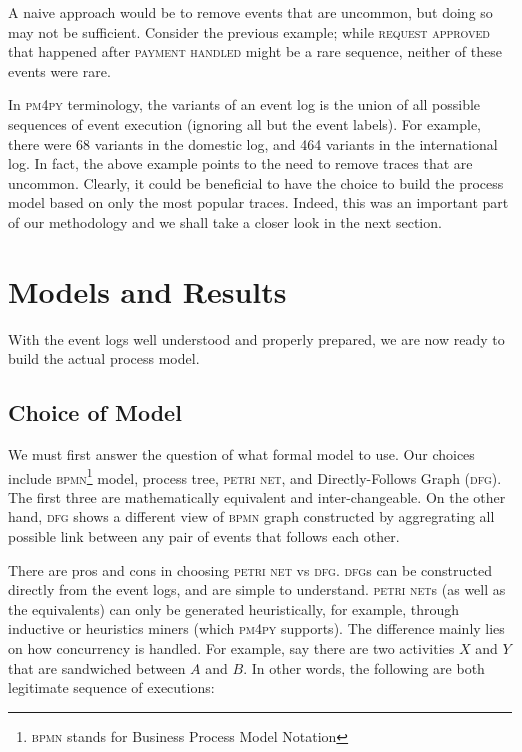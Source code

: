 \documentclass[conference]{IEEEtran}
\begin{document}
A naive approach would be to remove events that are uncommon, but doing so may
not be sufficient. Consider the previous example;
while \textsc{request approved} that happened after \textsc{payment handled}
might be a rare sequence, neither of these events were rare.

In \textsc{pm4py} terminology, the variants of an event log is the
union of all possible sequences of event execution (ignoring all but the
event labels). For example, there were
68 variants in the domestic log, and 464 variants in the international log.
In fact, the above example
points to the need to remove traces that are uncommon. Clearly, it could
be beneficial to have the choice to build the process model based on
only the most popular traces. Indeed, this was an important part of our
methodology and we shall take a closer look in the next section.

\section{Models and Results}
\label{section-models}


With the event logs well understood and properly prepared, we are now
ready to build the actual process model.

\subsection{Choice of Model}

We must first answer the
question of what formal model to use. Our choices include \textsc{bpmn}\footnote{\textsc{bpmn} stands for Business Process Model Notation}  model,
process tree, \textsc{petri net}, and Directly-Follows Graph (\textsc{dfg}). The
first three are mathematically equivalent and inter-changeable. On the other
hand, \textsc{dfg} shows a different view of \textsc{bpmn} graph constructed by aggregrating all possible link
between any pair of events that follows each other.

There are pros and cons in choosing \textsc{petri net} vs \textsc{dfg}. \textsc{dfg}s can be constructed
directly from the event logs, and are simple to understand. \textsc{petri net}s (as well
as the equivalents) can only be generated heuristically, for example, 
through inductive or heuristics miners (which \textsc{pm4py} supports).
The difference mainly lies on how concurrency is handled. For example,
say there are two activities $X$ and $Y$ that are sandwiched between
$A$ and $B$. In other words, the following are both legitimate sequence
of executions:
\end{document}

